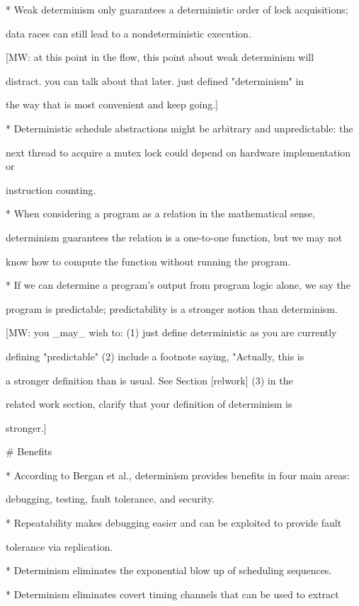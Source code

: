 * Weak determinism only guarantees a deterministic order of lock acquisitions;

  data races can still lead to a nondeterministic execution.

[MW: at this point in the flow, this point about weak determinism will

distract. you can talk about that later. just defined "determinism" in

the way that is most convenient and keep going.]

* Deterministic schedule abstractions might be arbitrary and unpredictable: the

  next thread to acquire a mutex lock could depend on hardware implementation or

  instruction counting.

* When considering a program as a relation in the mathematical sense,

  determinism guarantees the relation is a one-to-one function, but we may not

  know how to compute the function without running the program.

* If we can determine a program's output from program logic alone, we say the

  program is predictable; predictability is a stronger notion than determinism.

[MW: you _may_ wish to: (1) just define deterministic as you are currently

defining "predictable" (2) include a footnote saying, "Actually, this is

a stronger definition than is usual. See Section [relwork] (3) in the

related work section, clarify that your definition of determinism is

stronger.]



# Benefits

* According to Bergan et al., determinism provides benefits in four main areas:

  debugging, testing, fault tolerance, and security.

* Repeatability makes debugging easier and can be exploited to provide fault

  tolerance via replication.

* Determinism eliminates the exponential blow up of scheduling sequences.

* Determinism eliminates covert timing channels that can be used to extract

